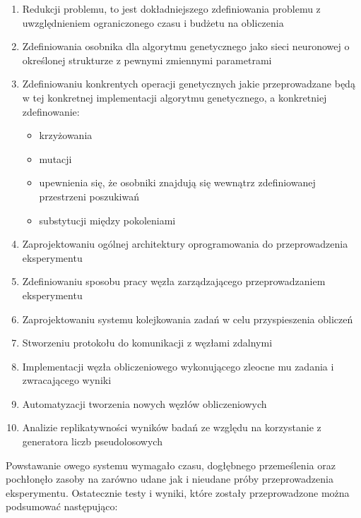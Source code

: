 \begin{enumerate}
  \item Redukcji problemu, to jest dokładniejszego zdefiniowania problemu z uwzględnieniem ograniczonego czasu i budżetu na obliczenia
  \item Zdefiniowania osobnika dla algorytmu genetycznego jako sieci neuronowej o określonej strukturze z pewnymi zmiennymi parametrami
  \item Zdefiniowaniu konkrentych operacji genetycznych jakie przeprowadzane będą w tej konkretnej implementacji algorytmu genetycznego, a konkretniej zdefinowanie:
  \begin{itemize}
    \item krzyżowania
    \item mutacji
    \item upewnienia się, że osobniki znajdują się wewnątrz zdefiniowanej przestrzeni poszukiwań
    \item substytucji między pokoleniami
  \end{itemize}
  \item Zaprojektowaniu ogólnej architektury oprogramowania do przeprowadzenia eksperymentu
  \item Zdefiniowaniu sposobu pracy węzła zarządzającego przeprowadzaniem eksperymentu
  \item Zaprojektowaniu systemu kolejkowania zadań w celu przyspieszenia obliczeń
  \item Stworzeniu protokołu do komunikacji z węzłami zdalnymi
  \item Implementacji węzła obliczeniowego wykonującego zleocne mu zadania i zwracającego wyniki
  \item Automatyzacji tworzenia nowych węzłów obliczeniowych
  \item Analizie replikatywności wyników badań ze względu na korzystanie z generatora liczb pseudolosowych
\end{enumerate}

Powstawanie owego systemu wymagało czasu, dogłębnego przemeślenia oraz pochłonęło zasoby na zarówno udane jak i nieudane próby przeprowadzenia eksperymentu.
Ostatecznie testy i wyniki, które zostały przeprowadzone można podsumować następująco:

